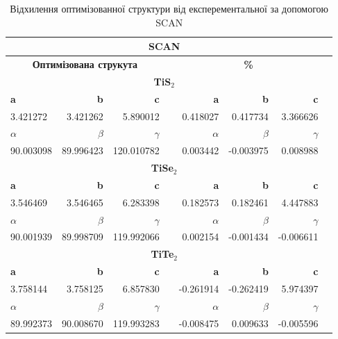 \begin{table}[!htp]\centering
\scriptsize
\begin{tabular}{lrrrrrrr}\toprule
\multicolumn{7}{c}{\textbf{SCAN}} \\\midrule
\multicolumn{3}{c}{\textbf{Оптимізована струкута}} & &\multicolumn{3}{c}{\textbf{\%}} \\
\multicolumn{7}{c}{\textbf{TiS$_2$}} \\
\textbf{a} &\textbf{b} &\textbf{c} & &\textbf{a} &\textbf{b} &\textbf{c} \\
3.421272 &3.421262 &5.890012 & &0.418027 &0.417734 &3.366626 \\
\textbf{$\alpha$} &\textbf{$\beta$} &\textbf{$\gamma$} & &\textbf{$\alpha$} &\textbf{$\beta$} &\textbf{$\gamma$} \\
90.003098 &89.996423 &120.010782 & &0.003442 &-0.003975 &0.008988 \\
\multicolumn{7}{c}{\textbf{TiSe$_2$}} \\
\textbf{a} &\textbf{b} &\textbf{c} & &\textbf{a} &\textbf{b} &\textbf{c} \\
3.546469 &3.546465 &6.283398 & &0.182573 &0.182461 &4.447883 \\
\textbf{$\alpha$} &\textbf{$\beta$} &\textbf{$\gamma$} & &\textbf{$\alpha$} &\textbf{$\beta$} &\textbf{$\gamma$} \\
90.001939 &89.998709 &119.992066 & &0.002154 &-0.001434 &-0.006611 \\
\multicolumn{7}{c}{\textbf{TiTe$_2$}} \\
\textbf{a} &\textbf{b} &\textbf{c} & &\textbf{a} &\textbf{b} &\textbf{c} \\
3.758144 &3.758125 &6.857830 & &-0.261914 &-0.262419 &5.974397 \\
\textbf{$\alpha$} &\textbf{$\beta$} &\textbf{$\gamma$} & &\textbf{$\alpha$} &\textbf{$\beta$} &\textbf{$\gamma$} \\
89.992373 &90.008670 &119.993283 & &-0.008475 &0.009633 &-0.005596 \\
\bottomrule
\end{tabular}
\caption{Відхилення оптимізованної структури від експерементальної за допомогою SCAN}\label{tab:SCANlat}
\end{table}

